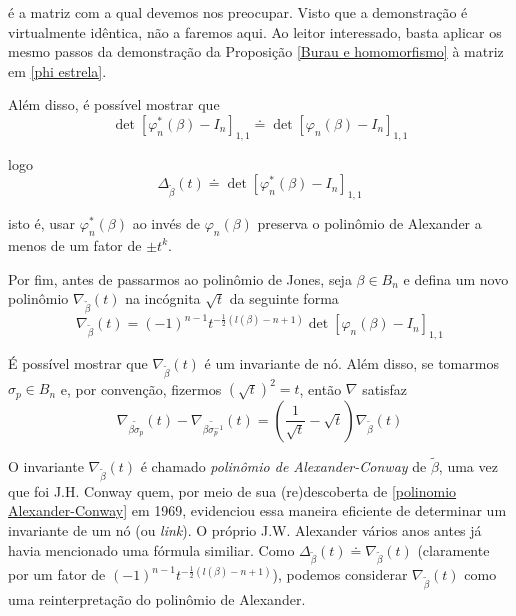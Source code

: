 \documentclass[a4paper,portuguese,11pt,twoside, leqno]{book}
\theoremstyle{definition}
\begin{document}
	\par\vspace{0.3cm} é a matriz com a qual devemos nos preocupar. Visto que a demonstração é virtualmente idêntica, não a faremos aqui. Ao leitor interessado, basta aplicar os mesmo passos da demonstração da Proposição \eqref{Burau e homomorfismo} à matriz em \eqref{phi estrela}.
	\par\vspace{0.3cm} Além disso, é possível mostrar que 
	\begin{equation*}
	\det[\varphi_n^\ast(\beta) - I_n]_{1,1}\doteq\det[\varphi_n(\beta) - I_n]_{1,1}
	\end{equation*}	
	\par\vspace{0.3cm} logo
	\begin{equation*}
	\Delta_{\widetilde{\beta}}(t) \doteq \det[\varphi_n^\ast(\beta) - I_n]_{1,1}
	\end{equation*}
	\par\vspace{0.3cm} isto é, usar $\varphi_n^\ast(\beta)$ ao invés de $\varphi_n(\beta)$ preserva o polinômio de Alexander a menos de um fator de $\pm t^k$. 
	\par\vspace{0.3cm} Por fim, antes de passarmos ao polinômio de Jones, seja $\beta\in B_n$ e defina um novo polinômio $\nabla_{\widetilde{\beta}}(t)$ na incógnita $\sqrt{t}$ da seguinte forma
	\begin{equation*}
	\nabla_{\widetilde{\beta}}(t) = (-1)^{n-1}t^{-\frac{1}{2}(l(\beta)-n+1)}\det[\varphi_n(\beta) - I_n]_{1,1}
	\end{equation*}
	\par\vspace{0.3cm} É possível mostrar que $\nabla_{\widetilde{\beta}}(t)$ é um invariante de nó. Além disso, se tomarmos $\sigma_p\in B_n$ e, por convenção, fizermos $(\sqrt{t})^2 = t$, então $\nabla$ satisfaz
	\begin{equation}
	\label{polinomio Alexander-Conway}
	\nabla_{\widetilde{\beta\sigma_p}}(t) - \nabla_{\widetilde{\beta\sigma_p^{-1}}}(t) = \left(\frac{1}{\sqrt{t}}- \sqrt{t}\right)\nabla_{\widetilde{\beta}}(t)
	\end{equation}
	\par\vspace{0.3cm} O invariante $\nabla_{\widetilde{\beta}}(t)$ é chamado \textit{polinômio de Alexander-Conway} de $\widetilde{\beta}$, uma vez que foi J.H. Conway quem, por meio de sua (re)descoberta de \eqref{polinomio Alexander-Conway} em 1969, evidenciou essa maneira eficiente de determinar um invariante de um nó (ou \textit{link}). O próprio J.W. Alexander vários anos antes já havia mencionado uma fórmula similiar. Como $\Delta_{\widetilde{\beta}}(t)\doteq\nabla_{\widetilde{\beta}}(t)$ (claramente por um fator de $(-1)^{n-1}t^{-\frac{1}{2}(l(\beta)-n+1)}$), podemos considerar $\nabla_{\widetilde{\beta}}(t)$ como uma reinterpretação do polinômio de Alexander. 
\end{document}
